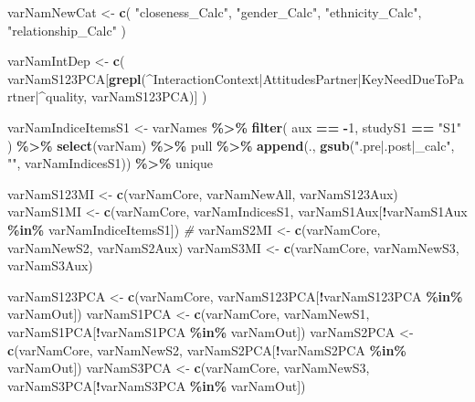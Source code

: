 \documentclass[
]{article}
\newenvironment{Shaded}{\begin{snugshade}}{\end{snugshade}}
\newcommand{\CommentTok}[1]{\textcolor[rgb]{0.56,0.35,0.01}{\textit{#1}}}
\newcommand{\DecValTok}[1]{\textcolor[rgb]{0.00,0.00,0.81}{#1}}
\newcommand{\FunctionTok}[1]{\textcolor[rgb]{0.13,0.29,0.53}{\textbf{#1}}}
\newcommand{\NormalTok}[1]{#1}
\newcommand{\OtherTok}[1]{\textcolor[rgb]{0.56,0.35,0.01}{#1}}
\newcommand{\SpecialCharTok}[1]{\textcolor[rgb]{0.81,0.36,0.00}{\textbf{#1}}}
\newcommand{\StringTok}[1]{\textcolor[rgb]{0.31,0.60,0.02}{#1}}
\begin{document}
\begin{Shaded}
\begin{Highlighting}[]
\NormalTok{varNamNewCat }\OtherTok{\textless{}{-}} \FunctionTok{c}\NormalTok{(}
  \StringTok{"closeness\_Calc"}\NormalTok{,}
  \StringTok{"gender\_Calc"}\NormalTok{,}
  \StringTok{"ethnicity\_Calc"}\NormalTok{,}
  \StringTok{"relationship\_Calc"}
\NormalTok{)}

\NormalTok{varNamIntDep }\OtherTok{\textless{}{-}} \FunctionTok{c}\NormalTok{(}
\NormalTok{  varNamS123PCA[}\FunctionTok{grepl}\NormalTok{(}\StringTok{\textquotesingle{}\^{}InteractionContext|AttitudesPartner|KeyNeedDueToPartner|\^{}quality\textquotesingle{}}\NormalTok{, varNamS123PCA)]}
\NormalTok{)}

\NormalTok{varNamIndiceItemsS1 }\OtherTok{\textless{}{-}}\NormalTok{ varNames }\SpecialCharTok{\%\textgreater{}\%}
  \FunctionTok{filter}\NormalTok{(}
\NormalTok{    aux }\SpecialCharTok{==} \SpecialCharTok{{-}}\DecValTok{1}\NormalTok{,}
\NormalTok{    studyS1 }\SpecialCharTok{==} \StringTok{"S1"}
\NormalTok{  ) }\SpecialCharTok{\%\textgreater{}\%}
  \FunctionTok{select}\NormalTok{(varNam) }\SpecialCharTok{\%\textgreater{}\%}
\NormalTok{  pull }\SpecialCharTok{\%\textgreater{}\%}
  \FunctionTok{append}\NormalTok{(., }\FunctionTok{gsub}\NormalTok{(}\StringTok{".pre|.post|\_calc"}\NormalTok{, }\StringTok{""}\NormalTok{, varNamIndicesS1)) }\SpecialCharTok{\%\textgreater{}\%}
\NormalTok{  unique}

\NormalTok{varNamS123MI }\OtherTok{\textless{}{-}} \FunctionTok{c}\NormalTok{(varNamCore, varNamNewAll, varNamS123Aux)}
\NormalTok{varNamS1MI }\OtherTok{\textless{}{-}} \FunctionTok{c}\NormalTok{(varNamCore, varNamIndicesS1, varNamS1Aux[}\SpecialCharTok{!}\NormalTok{varNamS1Aux }\SpecialCharTok{\%in\%}\NormalTok{ varNamIndiceItemsS1]) }\CommentTok{\#}
\NormalTok{varNamS2MI }\OtherTok{\textless{}{-}} \FunctionTok{c}\NormalTok{(varNamCore, varNamNewS2, varNamS2Aux)}
\NormalTok{varNamS3MI }\OtherTok{\textless{}{-}} \FunctionTok{c}\NormalTok{(varNamCore, varNamNewS3, varNamS3Aux)}

\NormalTok{varNamS123PCA }\OtherTok{\textless{}{-}} \FunctionTok{c}\NormalTok{(varNamCore, varNamS123PCA[}\SpecialCharTok{!}\NormalTok{varNamS123PCA }\SpecialCharTok{\%in\%}\NormalTok{ varNamOut])}
\NormalTok{varNamS1PCA }\OtherTok{\textless{}{-}} \FunctionTok{c}\NormalTok{(varNamCore, varNamNewS1, varNamS1PCA[}\SpecialCharTok{!}\NormalTok{varNamS1PCA }\SpecialCharTok{\%in\%}\NormalTok{ varNamOut])}
\NormalTok{varNamS2PCA }\OtherTok{\textless{}{-}} \FunctionTok{c}\NormalTok{(varNamCore, varNamNewS2, varNamS2PCA[}\SpecialCharTok{!}\NormalTok{varNamS2PCA }\SpecialCharTok{\%in\%}\NormalTok{ varNamOut])}
\NormalTok{varNamS3PCA }\OtherTok{\textless{}{-}} \FunctionTok{c}\NormalTok{(varNamCore, varNamNewS3, varNamS3PCA[}\SpecialCharTok{!}\NormalTok{varNamS3PCA }\SpecialCharTok{\%in\%}\NormalTok{ varNamOut])}


\end{Highlighting}
\end{Shaded}
\end{document}
